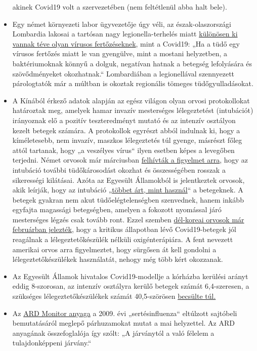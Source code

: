 \begin{itemize}
  akinek Covid19 volt a szervezetében (nem feltétlenül abba halt bele).
\item
  Egy német környezeti labor ügyvezetője úgy véli, az észak-olaszországi
  Lombardia lakosai a tartósan nagy legionella-terhelés miatt
  \href{https://m.apotheke-adhoc.de/nachrichten/detail/coronavirus/erhoehen-legionellen-die-todesrate-einer-corona-infektion/}{különösen
  ki vannak téve olyan vírusos fertőzéseknek}, mint a Covid19: „Ha a
  tüdő egy vírusos fertőzés miatt le van gyengülve, mint a mostani
  helyzetben, a baktériumoknak könnyű a dolguk, negatívan hatnak a
  betegség lefolyására és szövődményeket okozhatnak.`` Lombardiában a
  legionellával szennyezett párologtatók már a múltban is okoztak
  regionális tömeges tüdőgyulladásokat.
\item
  A Kínából érkező adatok alapján az egész világon olyan orvosi
  protokollokat határoztak meg, amelyek hamar invazív mesterséges
  lélegeztetést (intubációt) irányoznak elő a pozitív teszteredményt
  mutató és az intenzív osztályon kezelt betegek számára. A protokollok
  egyrészt abból indulnak ki, hogy a kíméletesebb, nem invazív, maszkos
  lélegeztetés túl gyenge, másrészt főleg attól tartanak, hogy „a
  veszélyes vírus`` ilyen esetben képes a levegőben terjedni. Német
  orvosok már márciusban
  \href{https://www.doccheck.com/de/detail/articles/26271-covid-19-beatmung-und-dann}{felhívták
  a figyelmet arra}, hogy az intubáció további tüdőkárosodást okozhat és
  összességében rosszak a sikerességi kilátásai. Azóta az Egyesült
  Államokból is jelentkeztek orvosok, akik leírják, hogy az intubáció
  „\href{https://www.youtube.com/watch?v=k9GYTc53r2o}{többet árt, mint
  használ}`` a betegeknek. A betegek gyakran nem akut
  tüdőelégtelenségben szenvednek, hanem inkább egyfajta magassági
  betegségben, amelyen a fokozott nyomással járó mesterséges légzés csak
  tovább ront. Ezzel szemben
  \href{https://www.upi.com/Top_News/World-News/2020/02/14/Oxygen-therapy-working-for-coronavirus-patient-Seoul-says/6651581696794/}{dél-koreai
  orvosok már februárban jelezték}, hogy a kritikus állapotban lévő
  Covid19-betegek jól reagálnak a lélegeztetőkészülék nélküli
  oxigénterápiára. A fent nevezett amerikai orvos arra figyelmeztet,
  hogy sürgősen át kell gondolni a lélegeztetőkészülékek használatát,
  nehogy még több kért okozzanak.
\item
  Az Egyesült Államok hivatalos Covid19-modellje a kórházba kerülési
  arányt eddig 8-szorosan, az intenzív osztályra kerülő betegek számát
  6,4-szeresen, a szükséges lélegeztetőkészülékek számát 40,5-szörösen
  \href{https://twitter.com/NikolovScience/status/1246823479820693505}{becsülte
  túl.}
\item
  Az \href{https://vimeo.com/403175258}{ARD Monitor anyaga} a 2009. évi
  „sertésinfluenza`` eltúlzott sajtóbeli bemutatásáról meglepő
  párhuzamokat mutat a mai helyzettel. Az ARD anyagának összefoglalója
  így szólt: „A járványtól a való félelem a tulajdonképpeni járvány.``
\end{itemize}

